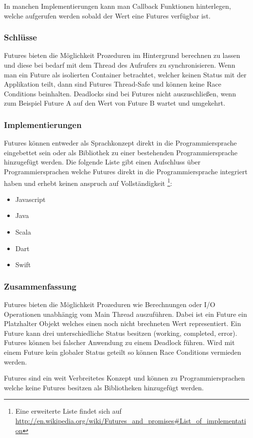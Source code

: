 In manchen Implementierungen kann man Callback Funktionen hinterlegen, welche aufgerufen werden sobald der Wert eine Futures verfügbar ist. 

\subsubsection{Schlüsse}
Futures bieten die Möglichkeit Prozeduren im Hintergrund berechnen zu lassen und diese bei bedarf mit dem Thread des Aufrufers zu synchronisieren. Wenn man ein Future als isolierten Container betrachtet, welcher keinen Status mit der Applikation teilt, dann sind Futures Thread-Safe und können keine Race Conditions beinhalten. Deadlocks sind bei Futures nicht auszuschließen, wenn zum Beispiel Future A auf den Wert von Future B wartet und umgekehrt.

\subsubsection{Implementierungen}
Futures können entweder als Sprachkonzept direkt in die Programmiersprache eingebettet sein oder als Bibliothek zu einer bestehenden Programmiersprache hinzugefügt werden. Die folgende Liste gibt einen Aufschluss über Programmiersprachen welche Futures direkt in die Programmiersprache integriert haben und erhebt keinen anspruch auf Vollständigkeit \footnote{Eine erweiterte Liste findet sich auf \url{http://en.wikipedia.org/wiki/Futures_and_promises#List_of_implementation}}:

\begin{itemize}
  \item Javascript
  \item Java
  \item Scala
  \item Dart
  \item Swift
\end{itemize}  

\subsubsection{Zusammenfassung}
Futures bieten die Möglichkeit Prozeduren wie Berechnungen oder I/O Operationen unabhängig vom Main Thread auszuführen. Dabei ist ein Future ein Platzhalter Objekt welches einen noch nicht brechneten Wert representiert. Ein Future kann drei unterschiedliche Status besitzen (working, completed, error). Futures können bei falscher Anwendung zu einem Deadlock führen. Wird mit einem Future kein globaler Status geteilt so können Race Conditions vermieden werden. 

Futures sind ein weit Verbreitetes Konzept und können zu Programmiersprachen welche keine Futures besitzen als Bibliotheken hinzugefügt werden.